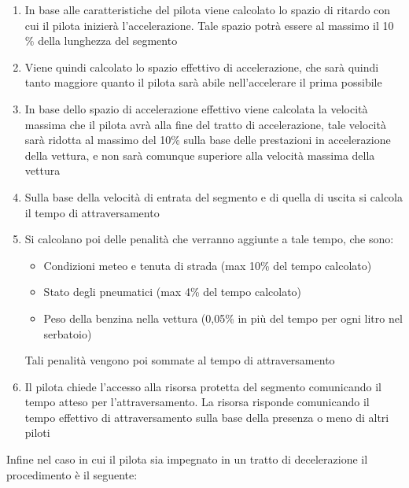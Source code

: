 \documentclass[a4paper,11pt, twoside, openright]{book}
\begin{document}
	  \begin{enumerate}
	    \item In base alle caratteristiche del pilota viene calcolato lo spazio di ritardo con cui il
		  pilota inizierà l'accelerazione. Tale spazio potrà essere al massimo il 10$\%$ della lunghezza del segmento
	    \item Viene quindi calcolato lo spazio effettivo di accelerazione, che sarà quindi tanto maggiore quanto
		  il pilota sarà abile nell'accelerare il prima possibile
	    \item In base dello spazio di accelerazione effettivo viene calcolata la velocità massima che il pilota avrà alla fine del 
		  tratto di accelerazione,
		  tale velocità sarà ridotta al massimo del 10$\%$ sulla base delle prestazioni in accelerazione della vettura,
		  e non sarà comunque superiore alla velocità massima della vettura
	    \item Sulla base della velocità di entrata del segmento e di quella di uscita si calcola il tempo di attraversamento
	    \item Si calcolano poi delle penalità che verranno aggiunte a tale tempo, che sono:
		  \begin{itemize}
		    \item Condizioni meteo e tenuta di strada (max 10\% del tempo calcolato)
		    \item Stato degli pneumatici (max 4\% del tempo calcolato)
		    \item Peso della benzina nella vettura (0,05\% in più del tempo per ogni litro nel serbatoio)
		  \end{itemize}
		  Tali penalità vengono poi sommate al tempo di attraversamento
	    \item Il pilota chiede l'accesso alla risorsa protetta del segmento
		  comunicando il tempo atteso per l'attraversamento. La risorsa risponde comunicando il tempo
		  effettivo di attraversamento sulla base della presenza o meno di altri piloti
	  \end{enumerate}
	  
	  Infine nel caso in cui il pilota sia impegnato in un tratto di decelerazione il procedimento è il seguente:
	  
\end{document}
